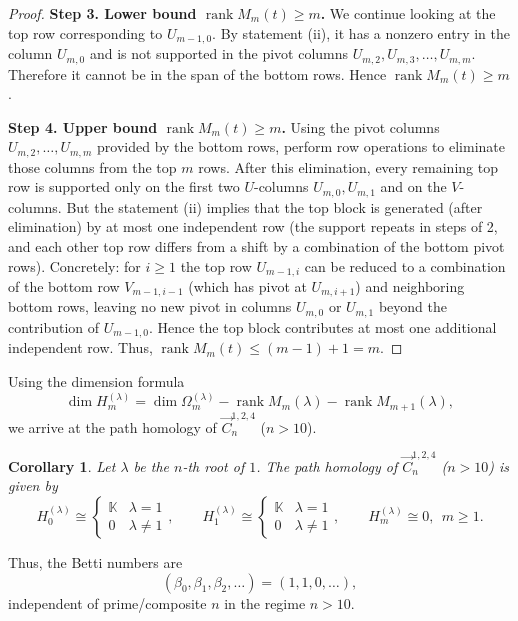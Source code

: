 \documentclass[11pt]{amsart}
\newcommand{\K}{\mathbb K}
\newcommand{\rank}{\operatorname{rank}}
\theoremstyle{plain}
\newtheorem{corollary}[theorem]{Corollary}
\theoremstyle{definition}
\numberwithin{equation}{section}
\begin{document}
\begin{proof}
\medskip
\noindent\textbf{Step 3. Lower bound $\rank M_m(t)\ge m$.}
We continue looking at the top row corresponding to $U_{m-1,0}$. By statement (ii), it has a nonzero entry in the column $U_{m,0}$ and is not supported in the pivot columns $U_{m,2},U_{m,3},\ldots,U_{m,m}$. Therefore it cannot be in the span of the bottom rows. Hence $\rank M_m(t)\ge m$.

\medskip
\noindent\textbf{Step 4. Upper bound $\rank M_m(t)\ge m$.}
Using the pivot columns $U_{m,2},\ldots, U_{m,m}$
provided by the bottom rows, perform row operations to eliminate those columns from the top $m$
rows. After this elimination, every remaining top row is supported only on the first two $U$-columns $U_{m,0}, U_{m,1}$ and on the $V$-columns. But the statement (ii) implies that the top block is generated
(after elimination) by at most one independent row (the support repeats in steps of 2, and each
other top row differs from a shift by a combination of the bottom pivot rows). Concretely: for $i\ge 1$
the top row $U_{m-1,i}$ can be reduced to a combination of the bottom row $V_{m-1,i-1}$ (which has pivot
at $U_{m,i+1}$) and neighboring bottom rows, leaving no new pivot in columns $U_{m,0}$ or $U_{m,1}$ beyond the
contribution of $U_{m-1,0}$. Hence the top block contributes at most one additional independent row. Thus, 
$\rank M_m(t)\leq (m-1)+1=m$.
\end{proof}


Using the dimension formula
\[\dim H_m^{(\lambda)}=\dim\Omega_m^{(\lambda)}-\rank M_m(\lambda)-\rank M_{m+1}(\lambda),\]
we arrive at the path homology of $\vec{C}_n^{1,2,4}$ ($n>10$).
\begin{corollary} Let $\lambda$ be the $n$-th root of $1$. 
The path homology of $\vec{C}_n^{1,2,4}$ ($n>10$) is given by
\[H_0^{(\lambda)}\cong\begin{cases}
    \K & \lambda=1\\
    0  & \lambda\neq1
\end{cases},
\qquad 
H_1^{(\lambda)}\cong\begin{cases}
    \K & \lambda=1\\
    0  & \lambda\neq1
\end{cases},
\qquad
H_m^{(\lambda)}\cong0,~~m\ge1.
\]
\end{corollary}

Thus, the Betti numbers are
\[
(\beta_0,\beta_1,\beta_2,\dots)=(1,1,0,\dots),
\]
independent of prime/composite $n$ in the regime $n>10$.

\medskip
\end{document}
